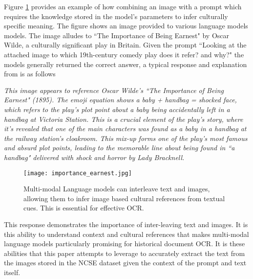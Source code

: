 Figure \ref{fig:importance_earnest} provides an example of how combining an image with a prompt which requires the knowledge stored in the model's parameters to infer culturally specific meaning. The figure shows an image provided to various language models \cite{anthropic_claude_2024, agarwal_many-shot_2024, team_gemini_2024, openai_gpt-4_2024} models. The image alludes to ``The Importance of Being Earnest" by Oscar Wilde, a culturally significant play in Britain. Given the prompt ``Looking at the attached image to which 19th-century comedy play does it refer? and why?" the models generally returned the correct answer, a typical response and explanation from \cite{anthropic_claude_2024} is as follows\newline

\textit{This image appears to reference Oscar Wilde's ``The Importance of Being Earnest" (1895). The emoji equation shows a baby + handbag = shocked face, which refers to the play's plot point about a baby being accidentally left in a handbag at Victoria Station. This is a crucial element of the play's story, where it's revealed that one of the main characters was found as a baby in a handbag at the railway station's cloakroom. This mix-up forms one of the play's most famous and absurd plot points, leading to the memorable line about being found in ``a handbag" delivered with shock and horror by Lady Bracknell.}
\newline

\begin{figure}
    \centering
    \texttt{[image: importance\_earnest.jpg]}
    \caption{Multi-modal Language models can interleave text and images, allowing them to infer image based cultural references from textual cues. This is essential for effective OCR. }
    \label{fig:importance_earnest}
\end{figure}


This response demonstrates the importance of inter-leaving text and images. It is this ability to understand context and cultural references that makes multi-modal language models particularly promising for historical document OCR. It is these abilities that this paper attempts to leverage to accurately extract the text from the images stored in the NCSE dataset given the context of the prompt and text itself.